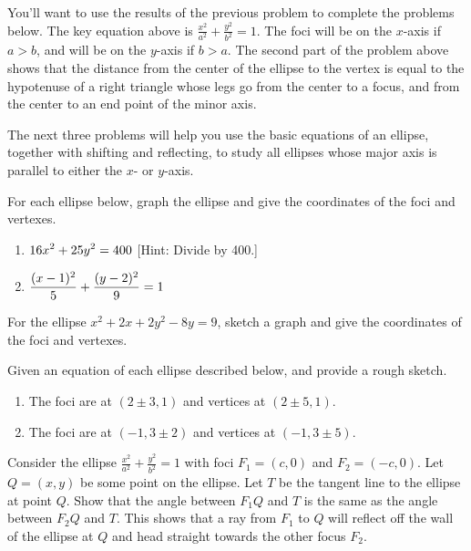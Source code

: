 You'll want to use the results of the previous problem to complete the problems below. The key equation above is $\frac{x^2}{a^2}+\frac{y^2}{b^2}=1$. The foci will be on the $x$-axis if $a>b$, and will be on the $y$-axis if $b>a$. The second part of the problem above shows that the distance from the center of the ellipse to the vertex is equal to the hypotenuse of a right triangle whose legs go from the center to a focus, and from the center to an end point of the minor axis. 

The next three problems will help you use the basic equations of an ellipse, together with shifting and reflecting, to study all ellipses whose major axis is parallel to either the $x$- or $y$-axis. 

\begin{problem}  
%
For each ellipse below, graph the ellipse and give the coordinates of the foci and vertexes. \begin{enumerate}
\item $\displaystyle 16x^2+25y^2=400$ [Hint: Divide by 400.]
\item $\displaystyle \frac{(x-1)^2}{5}+\frac{(y-2)^2}{9}=1$
\end{enumerate}
\end{problem}

\begin{problem}
For the ellipse $x^2+2x+2y^2-8y=9$, sketch a graph and give the coordinates of the foci and vertexes. 
\end{problem}

\begin{problem} 
%
Given an equation of each ellipse described below, and provide a rough sketch.
\begin{enumerate}
\item The foci are at $(2\pm 3,1)$ and vertices at $(2\pm 5, 1)$.
\item The foci are at $(-1,3\pm 2)$ and vertices at $(-1, 3\pm 5)$.
\end{enumerate}
\end{problem}


\begin{problem*}[Optional]
Consider the ellipse $\frac{x^2}{a^2}+\frac{y^2}{b^2}=1$ with foci $F_1=(c,0)$ and $F_2=(-c,0)$. 
Let $Q=(x,y)$ be some point on the ellipse. 
Let $T$ be the tangent line to the ellipse at point $Q$. 
Show that the angle between $F_1Q$ and $T$ is the same as the angle between $F_2Q$ and $T$. This shows that a ray from $F_1$ to $Q$ will reflect off the wall of the ellipse at $Q$ and head straight towards the other focus $F_2$.
\end{problem*}


